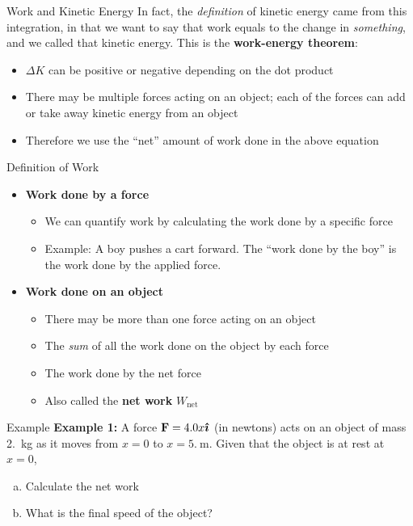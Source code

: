 \documentclass[12pt,compress,aspectratio=169]{beamer}
\newcommand{\mb}[1]{\ensuremath\mathbf{#1}}
\newcommand{\eq}[2]{\vspace{#1}{\Large\begin{displaymath}#2\end{displaymath}}}
\begin{document}
\begin{frame}{Work and Kinetic Energy}
  In fact, the \emph{definition} of kinetic energy came from this integration,
  in that we want to say that work equals to the change in \emph{something},
  and we called that kinetic energy. This is the \textbf{work-energy theorem}:

  \eq{-.15in}{
    \boxed{W_\mathrm{net}=\Delta K}
  }
  \begin{itemize}
  \item\vspace{-.15in} $\Delta K$ can be positive or negative depending on the
    dot product
  \item There may be multiple forces acting on an object; each of the forces
    can add or take away kinetic energy from an object
  \item Therefore we use the ``net'' amount of work done in the above equation
  \end{itemize}
\end{frame}



\begin{frame}{Definition of Work}
  \begin{itemize}
  \item\textbf{Work done by a force}
    \begin{itemize}
    \item We can quantify work by calculating the work done by a specific force
    \item Example: A boy pushes a cart forward. The ``work done by the boy'' is
      the work done by the applied force.
    \end{itemize}
  \item\textbf{Work done on an object}
    \begin{itemize}
    \item There may be more than one force acting on an object
    \item The \emph{sum} of all the work done on the object by each force
    \item The work done by the net force
    \item Also called the \textbf{net work} $W_\mathrm{net}$
    \end{itemize}
  \end{itemize}
\end{frame}



\begin{frame}{Example}
  \textbf{Example 1:} A force $\mb{F}=4.0x\bm{\hat{\imath}}$ (in newtons) acts
  on an object of mass \SI{2.}{\kilo\gram} as it moves from $x=0$ to
  $x=\SI{5.}{\metre}$. Given that the object is at rest at $x=0$,
  \begin{enumerate}[(a)]
  \item Calculate the net work
  \item What is the final speed of the object?
  \end{enumerate}
\end{frame}
\end{document}

